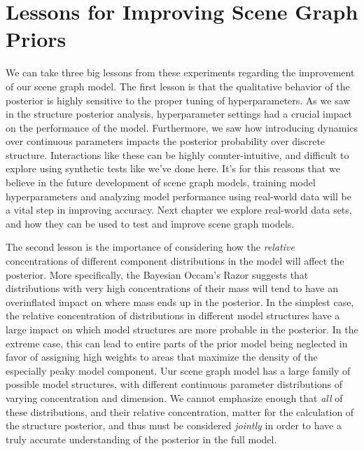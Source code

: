 \pagebreak

\section{Lessons for Improving Scene Graph Priors}
We can take three big lessons from these experiments regarding the improvement of our scene graph model.
The first lesson is that the qualitative behavior of the posterior is highly sensitive to the proper tuning of hyperparameters.
As we saw in the structure posterior analysis, hyperparameter settings had a crucial impact on the performance of the model.
Furthermore, we saw how introducing dynamics over continuous parameters impacts the posterior probability over discrete structure.
Interactions like these can be highly counter-intuitive, and difficult to explore using synthetic tests like we've done here.
It's for this reasons that we believe in the future development of scene graph models, training model hyperparameters and analyzing model performance using real-world data will be a vital step in improving accuracy.
Next chapter we explore real-world data sets, and how they can be used to test and improve scene graph models.

The second lesson is the importance of considering how the \textit{relative} concentrations of different component distributions in the model will affect the posterior.
More specifically, the Bayesian Occam's Razor suggests that distributions with very high concentrations of their mass will tend to have an overinflated impact on where mass ends up in the posterior.
In the simplest case, the relative concentration of distributions in different model structures have a large impact on which model structures are more probable in the posterior.
In the extreme case, this can lead to entire parts of the prior model being neglected in favor of assigning high weights to areas that maximize the density of the especially peaky model component.
Uur scene graph model has a large family of possible model structures, with different continuous parameter distributions of varying concentration and dimension.
We cannot emphasize enough that \textit{all} of these distributions, and their relative concentration, matter for the calculation of the structure posterior, and thus must be considered \textit{jointly} in order to have a truly accurate understanding of the posterior in the full model.
